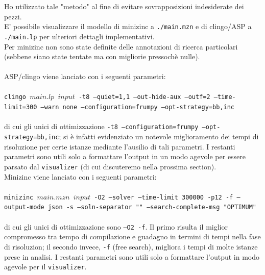 \documentclass{article}
\begin{document}
Ho utilizzato tale "metodo" al fine di evitare sovrapposizioni indesiderate dei pezzi. \\
E' possibile visualizzare il modello di minizinc a \texttt{./main.mzn} e di clingo/ASP a \texttt{./main.lp} per ulteriori dettagli implementativi.\\
Per minizinc non sono state definite delle annotazioni di ricerca particolari (sebbene siano state tentate ma con migliorie pressochè nulle).\\\\
ASP/clingo viene lanciato con i seguenti parametri:\\\\
\hspace*{.5cm}\texttt{clingo $main.lp$ $input$ -t8 --quiet=1,1 --out-hide-aux --outf=2 --time-limit=300 --warn none --configuration=frumpy --opt-strategy=bb,inc}\\\\
di cui gli unici di ottimizzazione \texttt{-t8 --configuration=frumpy --opt-strategy=bb,inc}; si è infatti evidenziato un notevole miglioramento dei tempi di risoluzione per certe istanze mediante l'ausilio di tali parametri. I restanti parametri sono utili solo a formattare l'output in un modo agevole per essere parsato dal \texttt{visualizer} (di cui discuteremo nella prossima section).\\
Minizinc viene lanciato con i seguenti parametri:\\\\
\hspace*{.5cm}\texttt{minizinc $main.mzn$ $input$ -O2 --solver {} --time-limit 300000 -p12 -f --output-mode json -s --soln-separator "" --search-complete-msg "OPTIMUM"}\\\\
di cui gli unici di ottimizzazione sono \texttt{--O2 -f}. Il primo risulta il miglior compromesso tra tempo di compilazione e guadagno in termini di tempi nella fase di risoluzion; il secondo invece, \texttt{-f} (free search), migliora i tempi di molte istanze prese in analisi. I restanti parametri sono utili solo a formattare l'output in modo agevole per il \texttt{visualizer}.
\end{document}
